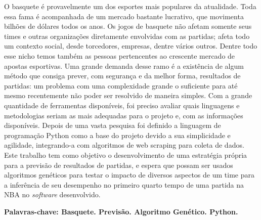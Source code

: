 \documentclass[brazilian]{ifsc-tcc}
\begin{document}
\pretextual%
\imprimircapa%
\imprimirfolhaderosto*%
\clearpage
\imprimirfichacatalografica%

\clearpage

\begin{resumo}[resumo]

O basquete é provavelmente um dos esportes mais populares da atualidade. Toda essa fama é acompanhada de um mercado bastante lucrativo, que movimenta bilhões de dólares todos os anos. Os jogos de basquete não afetam somente seus times e outras organizações diretamente envolvidas com as partidas; afeta todo um contexto social, desde torcedores, empresas, dentre vários outros. Dentre todo esse nicho temos também as pessoas pertencentes ao crescente mercado de apostas esportivas. %
Uma grande demanda desse ramo é a existência de algum método que consiga prever, com segurança e da melhor forma, resultados de partidas: um problema com uma complexidade grande o suficiente para até mesmo recentemente não poder ser resolvido de maneira simples. %
Com a grande quantidade de ferramentas disponíveis, foi preciso avaliar quais linguagens e metodologias seriam as mais adequadas para o projeto e, com as informações disponíveis. Depois de uma vasta pesquisa foi definido a linguagem de programação Python como a base do projeto devido a sua simplicidade e agilidade, integrando-a com algoritmos de web scraping para coleta de dados.
Este trabalho tem como objetivo o desenvolvimento de uma estratégia própria para a previsão de resultados de partidas, e espera que possam ser usados algoritmos genéticos para testar o impacto de diversos aspectos de um time para a inferência de seu desempenho no primeiro quarto tempo de uma partida na NBA no \textit{software} desenvolvido. \newline

\noindent \textbf{Palavras-chave: Basquete. Previsão. Algoritmo Genético. Python.}

\end{resumo}
\end{document}

